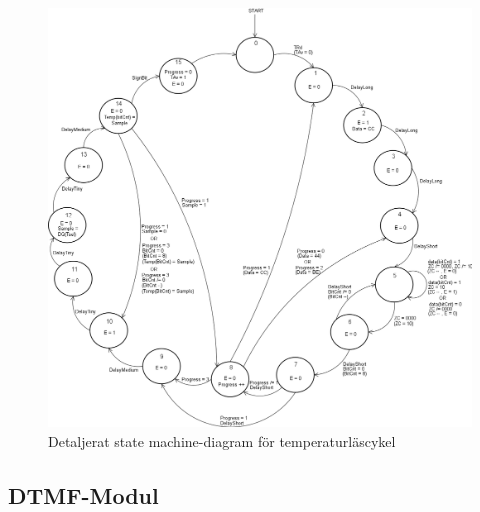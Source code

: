 \documentclass[a4paper,11pt]{article}
\begin{document}
	\begin{figure}[H]
	  \centering
	      \includegraphics[scale=0.4, angle=0]{TempStateMachineDiagram.png}
	  	\caption{Detaljerat state machine-diagram för temperaturläscykel}
		\label{fig:TempSM}
	\end{figure}
	
\pagebreak

		\subsection{DTMF-Modul}
\end{document}

